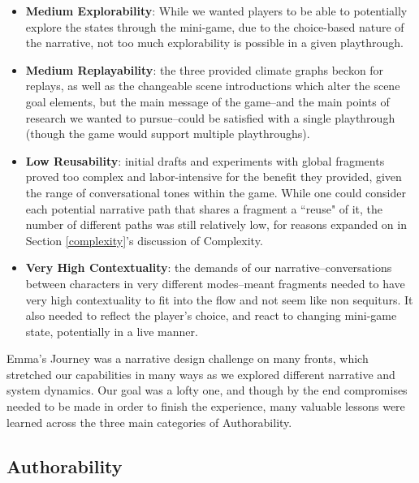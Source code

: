 \begin{itemize}
    \item \textbf{Medium Explorability}: While we wanted players to be able to potentially explore the states through the mini-game, due to the choice-based nature of the narrative, not too much explorability is possible in a given playthrough.
    \item \textbf{Medium Replayability}: the three provided climate graphs beckon for replays, as well as the changeable scene introductions which alter the scene goal elements, but the main message of the game--and the main points of research we wanted to pursue--could be satisfied with a single playthrough (though the game would support multiple playthroughs).
    \item \textbf{Low Reusability}: initial drafts and experiments with global fragments proved too complex and labor-intensive for the benefit they provided, given the range of conversational tones within the game. While one could consider each potential narrative path that shares a fragment a ``reuse" of it, the number of different paths was still relatively low, for reasons expanded on in Section \ref{complexity}'s discussion of Complexity.
    \item \textbf{Very High Contextuality}: the demands of our narrative--conversations between characters in very different modes--meant fragments needed to have very high contextuality to fit into the flow and not seem like non sequiturs. It also needed to reflect the player's choice, and react to changing mini-game state, potentially in a live manner.
\end{itemize}


 


Emma's Journey was a narrative design challenge on many fronts, which stretched our capabilities in many ways as we explored different narrative and system dynamics. Our goal was a lofty one, and though by the end compromises needed to be made in order to finish the experience, many valuable lessons were learned across the three main categories of Authorability.

\subsection{Authorability}

